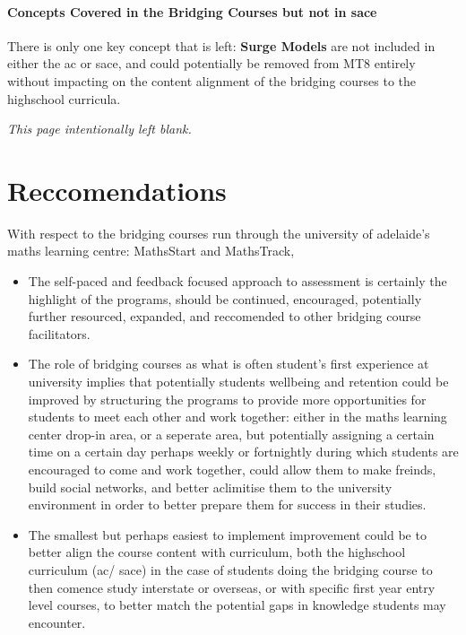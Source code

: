 \documentclass[twoside,12pt,a4paper]{report}
\makeatletter
\newcommand*{\intentionallyblankpage}{
  \vspace*{\fill}
  {\centering \textit{This page intentionally left blank.} \par}
  \vspace{\fill}}
\renewcommand*{\cleardoublepage}{\clearpage\if@twoside \ifodd\c@page\else
  \intentionallyblankpage
  \newpage
  \if@twocolumn\hbox{}\newpage\fi\fi\fi}
\makeatother
\begin{document}
\subsubsection{Concepts Covered in the Bridging Courses but not in \gls{sace}}

There is only one key concept that is left: \textbf{Surge Models} are not included in either the \gls{ac} or \gls{sace}, and could potentially be removed from MT8 entirely without impacting on the content alignment of the bridging courses to the highschool curricula.	






\cleardoublepage
\chapter{Reccomendations}
\label{chap:recommendations}

With respect to the bridging courses run through the university of adelaide's maths learning centre: MathsStart and MathsTrack,
\begin{itemize}
	\item The self-paced and feedback focused approach to assessment is certainly the highlight of the programs, should be continued, encouraged, potentially further resourced, expanded, and reccomended to other bridging course facilitators.
	\item The role of bridging courses as what is often student's first experience at university implies that potentially students wellbeing and retention could be improved by structuring the programs to provide more opportunities for students to meet each other and work together: either in the maths learning center drop-in area, or a seperate area, but potentially assigning a certain time on a certain day perhaps weekly or fortnightly during which students are encouraged to come and work together, could allow them to make freinds, build social networks, and better aclimitise them to the university environment in order to better prepare them for success in their studies.
	\item The smallest but perhaps easiest to implement improvement could be to better align the course content with curriculum, both the highschool curriculum (\gls{ac}/ \gls{sace}) in the case of students doing the bridging course to then comence study interstate or overseas, or with specific first year entry level courses, to better match the potential gaps in knowledge students may encounter.
\end{itemize}
\end{document}

